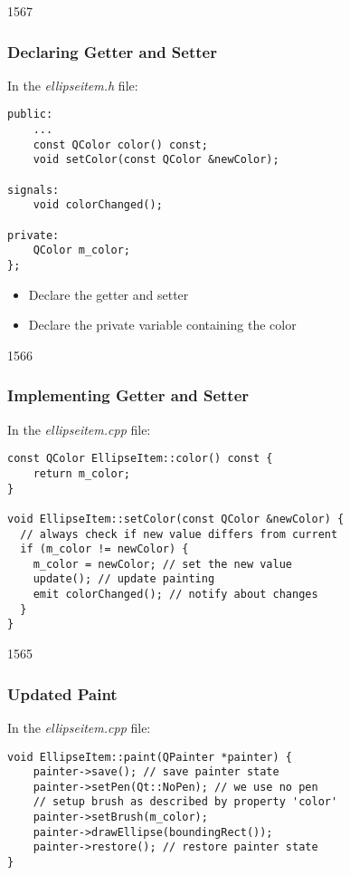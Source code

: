 \begin{slide}[fragile]{1567}\frametitle{Declaring Getter and Setter}

In the \textit{ellipseitem.h} file:

\vspace*{0.5em}
\begin{lstlisting}
public:
    ...
    const QColor color() const;
    void setColor(const QColor &newColor);

signals:
    void colorChanged();

private:
    QColor m_color;
};
\end{lstlisting}

\begin{itemize}
\item Declare the getter and setter
\item Declare the private variable containing the color
\end{itemize}

\end{slide}

\begin{slide}[fragile]{1566}\frametitle{Implementing Getter and Setter}

In the \textit{ellipseitem.cpp} file:

\vspace*{0.25em}
\begin{lstlisting}
const QColor EllipseItem::color() const {
    return m_color;
}

void EllipseItem::setColor(const QColor &newColor) {
  // always check if new value differs from current
  if (m_color != newColor) {
    m_color = newColor; // set the new value
    update(); // update painting
    emit colorChanged(); // notify about changes
  }
}
\end{lstlisting}

\end{slide}

\begin{slide}[fragile]{1565}\frametitle{Updated Paint}

In the \textit{ellipseitem.cpp} file:

\vspace*{0.5em}
\begin{lstlisting}
void EllipseItem::paint(QPainter *painter) {
    painter->save(); // save painter state
    painter->setPen(Qt::NoPen); // we use no pen
    // setup brush as described by property 'color'
    painter->setBrush(m_color); 
    painter->drawEllipse(boundingRect());
    painter->restore(); // restore painter state
}
\end{lstlisting}

\end{slide}


